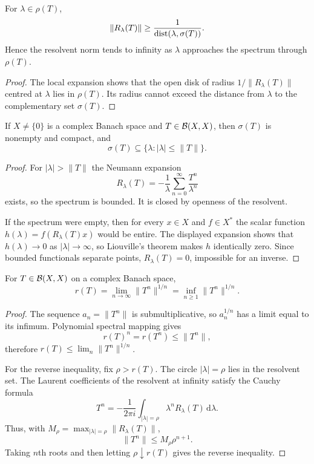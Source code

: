 \begin{notetheorem}
For $\lambda\in\rho(T)$,
\[
  \|R_\lambda(T)\|
  \ge \frac1{\operatorname{dist}(\lambda,\sigma(T))}.
\]
Hence the resolvent norm tends to infinity as $\lambda$ approaches the
spectrum through $\rho(T)$.
\end{notetheorem}

\begin{proof}
The local expansion shows that the open disk of radius
$1/\|R_\lambda(T)\|$ centred at $\lambda$ lies in $\rho(T)$.  Its radius
cannot exceed the distance from $\lambda$ to the complementary set
$\sigma(T)$.
\end{proof}

\begin{notetheorem}
If $X\ne\{0\}$ is a complex Banach space and $T\in\mathcal{B}(X,X)$, then
$\sigma(T)$ is nonempty and compact, and
\[
  \sigma(T)\subseteq\{\lambda:|\lambda|\le\|T\|\}.
\]
\end{notetheorem}

\begin{proof}
For $|\lambda|>\|T\|$ the Neumann expansion
\[
  R_\lambda(T)
  =-\frac1\lambda\sum_{n=0}^{\infty}\frac{T^n}{\lambda^n}
\]
exists, so the spectrum is bounded.  It is closed by openness of the
resolvent.

If the spectrum were empty, then for every $x\in X$ and $f\in X^*$ the
scalar function $h(\lambda)=f(R_\lambda(T)x)$ would be entire.  The displayed
expansion shows that $h(\lambda)\to0$ as $|\lambda|\to\infty$, so Liouville's
theorem makes $h$ identically zero.  Since bounded functionals separate
points, $R_\lambda(T)=0$, impossible for an inverse.
\end{proof}

\begin{notetheorem}
For $T\in\mathcal{B}(X,X)$ on a complex Banach space,
\[
  r(T)=\lim_{n\to\infty}\|T^n\|^{1/n}
      =\inf_{n\ge1}\|T^n\|^{1/n}.
\]
\end{notetheorem}

\begin{proof}
The sequence $a_n=\|T^n\|$ is submultiplicative, so
$a_n^{1/n}$ has a limit equal to its infimum.  Polynomial spectral mapping
gives
\[
  r(T)^n=r(T^n)\le\|T^n\|,
\]
therefore $r(T)\le\lim_n\|T^n\|^{1/n}$.

For the reverse inequality, fix $\rho>r(T)$.  The circle
$|\lambda|=\rho$ lies in the resolvent set.  The Laurent coefficients of the
resolvent at infinity satisfy the Cauchy formula
\[
  T^n=-\frac1{2\pi i}\int_{|\lambda|=\rho}
       \lambda^nR_\lambda(T)\,\mathrm d\lambda.
\]
Thus, with $M_\rho=\max_{|\lambda|=\rho}\|R_\lambda(T)\|$,
\[
  \|T^n\|\le M_\rho\rho^{n+1}.
\]
Taking $n$th roots and then letting $\rho\downarrow r(T)$ gives the reverse
inequality.
\end{proof}

